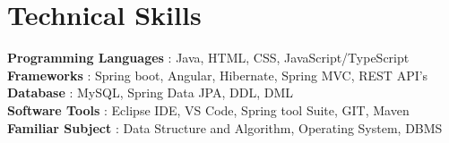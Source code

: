 \documentclass[letterpaper,11pt]{article}
\begin{document}
\section{Technical Skills}
 \begin{itemize}[leftmargin=0.15in, label={}]
    \small{\item{
     \textbf{Programming Languages}{\hspace{0.2cm} : Java, HTML, CSS, JavaScript/TypeScript} \\
     \textbf{Frameworks}{\hspace{2.45cm} : Spring boot, Angular, Hibernate, Spring MVC, REST API’s } \\
     \textbf{Database}{\hspace{2.95cm} : MySQL, Spring Data JPA, DDL, DML} \\
     \textbf{Software Tools}{\hspace{2cm} : Eclipse IDE, VS Code, Spring tool Suite, GIT, Maven } \\
     \textbf{Familiar Subject}{\hspace{1.66cm} : Data Structure and Algorithm, Operating System, DBMS}\\     
    }}
 \end{itemize}


\end{document}
